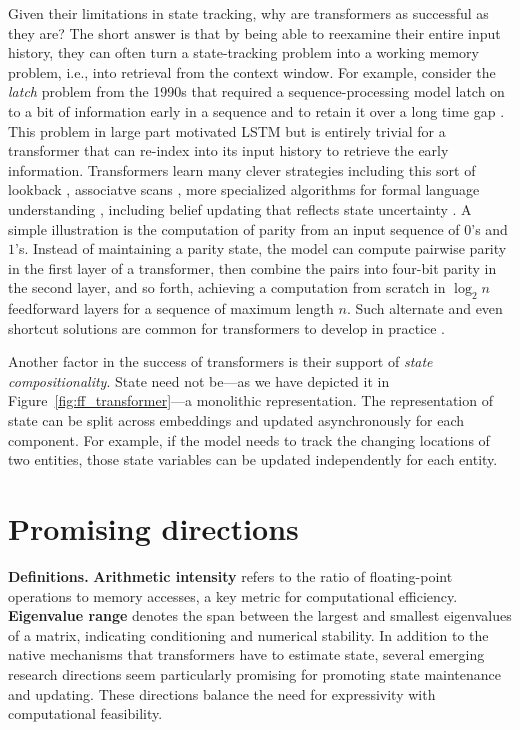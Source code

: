\documentclass{article}
\begin{document}
Given their limitations in state tracking, why are transformers as successful
as they are? The short answer is that by being able to reexamine their entire input
history, they can often turn a state-tracking problem into a working memory problem, 
i.e., into retrieval from the context window. For example, consider the
\emph{latch} problem from the 1990s that required a sequence-processing model latch
on to a bit of information early in a sequence and to retain it over a long time gap
\citep{mozer1991induction,Bengio1994}. This problem in large part motivated LSTM but is entirely trivial for a transformer that can re-index into its input history to retrieve
the early information. Transformers learn many clever strategies including this
sort of lookback \citep{prakash2026}, associatve scans \citep{li2025},
more specialized algorithms for formal language understanding
\citep{allenzhu2025physicslanguagemodels1,piotrowski2025}, including
belief updating that reflects state uncertainty \citep{shai2024}.
A simple illustration is the computation of parity from an input sequence
of $0$'s and $1$'s. Instead of maintaining a parity state, the model can compute pairwise
parity in the first layer of a transformer, then combine the pairs into four-bit
parity in the second layer, and so forth, achieving a computation from scratch in
$\log_2 n$ feedforward layers for a sequence of maximum length $n$.
Such alternate and even shortcut solutions are common for transformers to develop in practice \citep{liu2022transformers}.

Another factor in the success of transformers is their support of
\emph{state compositionality}.  State need not be---as we have depicted 
it in Figure~\ref{fig:ff_transformer}---a monolithic representation.
The representation of state can be split across embeddings and updated
asynchronously for each component. For example, if the model needs to 
track the changing locations of two entities, those state variables can be updated
independently for each entity.

\section{Promising directions}

\noindent\textbf{Definitions.} \textbf{Arithmetic intensity} refers to the ratio of floating-point operations to memory accesses, a key metric for computational efficiency. \textbf{Eigenvalue range} denotes the span between the largest and smallest eigenvalues of a matrix, indicating conditioning and numerical stability.
In addition to the native mechanisms that transformers have to estimate state, 
several emerging research directions seem particularly promising for promoting
state maintenance and updating. These directions balance the need for 
expressivity with computational feasibility.
\end{document}
